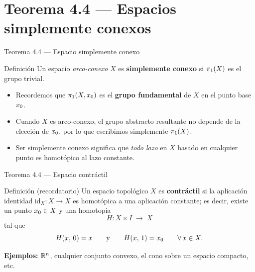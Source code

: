 \section{Teorema 4.4 — Espacios simplemente conexos}

\begin{frame}{Teorema 4.4 — Espacio simplemente conexo}

  \begin{block}{Definición}
    Un espacio \emph{arco-conexo} $X$ es \textbf{simplemente conexo}
    si $\pi_1(X)$ es el grupo trivial.
  \end{block}

  \bigskip
  \begin{itemize}
    \item Recordemos que $\pi_1(X, x_0)$ es el \textbf{grupo fundamental}
          de $X$ en el punto base $x_0$.
    \item Cuando $X$ es arco-conexo, el grupo abstracto resultante no
          depende de la elección de $x_0$, por lo que escribimos
          simplemente $\pi_1(X)$.
    \item Ser simplemente conexo significa que \emph{todo lazo} en $X$
          basado en cualquier punto es homotópico al lazo constante.
  \end{itemize}

\end{frame}

\begin{frame}{Teorema 4.4 — Espacio contráctil}

  \begin{alertblock}{Definición (recordatorio)}
    Un espacio topológico $X$ es \textbf{contráctil} si la aplicación
    identidad $\mathrm{id}_X : X \to X$ es homotópica a una aplicación
    constante; es decir, existe un punto $x_0 \in X$ y una homotopía
    \[
      H : X \times I \;\longrightarrow\; X
    \]
    tal que
    \[
      H(x,\,0) = x \qquad \text{y} \qquad H(x,\,1) = x_0
      \qquad \forall\, x \in X.
    \]
  \end{alertblock}

  \bigskip
  \textbf{Ejemplos:} $\mathbb{R}^n$, cualquier conjunto convexo, el cono sobre
  un espacio compacto, etc.

\end{frame}

